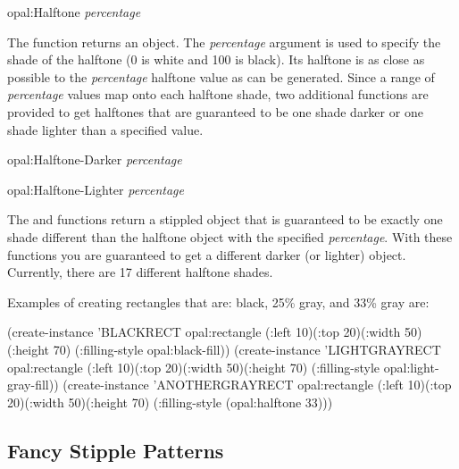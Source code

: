 \vspace{.5 line}
\begin{programexample}
opal:Halftone {\it percentage}\value{function}
\end{programexample}

\label{halftone}
The  function returns an  object.  The
{\it percentage} argument is used to specify the shade of the halftone (0 is
white and 100 is black).  Its halftone is as close as possible to the
{\it percentage} halftone value as can be generated.  Since a range of
{\it percentage} values map onto each halftone shade, two additional
functions are provided to get halftones that are guaranteed to be one
shade darker or one shade lighter than a specified value.

\vspace{.5 line}
\begin{programexample}
opal:Halftone-Darker {\it percentage}\value{function}

opal:Halftone-Lighter {\it percentage}\value{function}
\end{programexample}

The  and  functions return a stippled
 object that is guaranteed to be exactly one shade
different than the halftone object with the specified
{\it percentage}. With these functions you are guaranteed to get a different
darker (or lighter)  object.  Currently, there are 17
different halftone shades.

\vspace{1 line}
\begin{group}
Examples of creating rectangles that are: black, 25\% gray, and 33\% gray are:

\begin{programexample}
(create-instance 'BLACKRECT opal:rectangle
   (:left 10)(:top 20)(:width 50)(:height 70)
   (:filling-style opal:black-fill))
(create-instance 'LIGHTGRAYRECT opal:rectangle
   (:left 10)(:top 20)(:width 50)(:height 70)
   (:filling-style opal:light-gray-fill))
(create-instance 'ANOTHERGRAYRECT opal:rectangle
   (:left 10)(:top 20)(:width 50)(:height 70)
   (:filling-style (opal:halftone 33)))
\end{programexample}
\end{group}


\subsection{Fancy Stipple Patterns}
\label{fancy-stipple}

